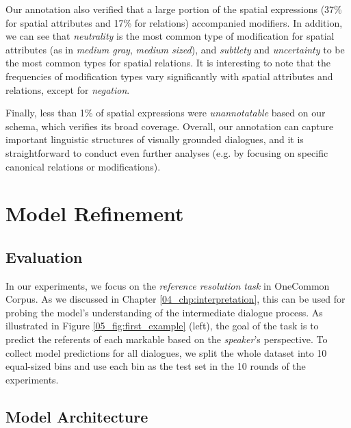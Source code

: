 Our annotation also verified that a large portion of the spatial expressions (37\% for spatial attributes and 17\% for relations) accompanied modifiers. In addition, we can see that \textit{neutrality} is the most common type of modification for spatial attributes (as in \textit{medium gray}, \textit{medium sized}), and \textit{subtlety} and \textit{uncertainty} to be the most common types for spatial relations. It is interesting to note that the frequencies of modification types vary significantly with spatial attributes and relations, except for \textit{negation}.

Finally, less than 1\% of spatial expressions were \textit{unannotatable} based on our schema, which verifies its broad coverage. Overall, our annotation can capture important linguistic structures of visually grounded dialogues, and it is straightforward to conduct even further analyses (e.g. by focusing on specific canonical relations or modifications).

\section{Model Refinement}
\label{05_sec:model_evaluation}


\subsection{Evaluation}
\label{05_subsec:evaluation}

In our experiments, we focus on the \textit{reference resolution task} in OneCommon Corpus. As we discussed in Chapter \ref{04_chp:interpretation}, this can be used for probing the model's understanding of the intermediate dialogue process. As illustrated in Figure \ref{05_fig:first_example} (left), the goal of the task is to predict the referents of each markable based on the \textit{speaker}'s perspective. To collect model predictions for all dialogues, we split the whole dataset into 10 equal-sized bins and use each bin as the test set in the 10 rounds of the experiments.

\subsection{Model Architecture}
\label{05_subsec:models}


